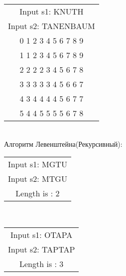 \begin{tabular}{c}
Input s1: KNUTH\\
Input s2: TANENBAUM\\

0 1 2 3 4 5 6 7 8 9\\
1 1 2 3 4 5 6 7 8 9\\
2 2 2 2 3 4 5 6 7 8\\
3 3 3 3 3 4 5 6 6 7\\
4 3 4 4 4 4 5 6 7 7\\
5 4 4 5 5 5 5 6 7 8\\
\end{tabular}\\

Алгоритм Левенштейна(Рекурсивный):

\begin{tabular}{c}
Input s1: MGTU\\
Input s2: MTGU\\
Length is : 2\\
\end{tabular}\\

\begin{tabular}{c}
Input s1: OTAPA\\
Input s2: TAPTAP\\
Length is : 3\\
\end{tabular}\\
